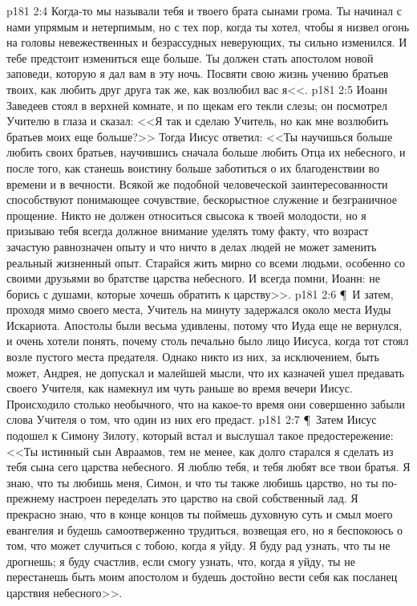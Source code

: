 \vs p181 2:4 Когда\hyp{}то мы называли тебя и твоего брата сынами грома. Ты начинал с нами упрямым и нетерпимым, но с тех пор, когда ты хотел, чтобы я низвел огонь на головы невежественных и безрассудных неверующих, ты сильно изменился. И тебе предстоит измениться еще больше. Ты должен стать апостолом новой заповеди, которую я дал вам в эту ночь. Посвяти свою жизнь учению братьев твоих, как любить друг друга так же, как возлюбил вас я<<.
\vs p181 2:5 Иоанн Заведеев стоял в верхней комнате, и по щекам его текли слезы; он посмотрел Учителю в глаза и сказал: <<Я так и сделаю Учитель, но как мне возлюбить братьев моих еще больше?>> Тогда Иисус ответил: <<Ты научишься больше любить своих братьев, научившись сначала больше любить Отца их небесного, и после того, как станешь воистину больше заботиться о их благоденствии во времени и в вечности. Всякой же подобной человеческой заинтересованности способствуют понимающее сочувствие, бескорыстное служение и безграничное прощение. Никто не должен относиться свысока к твоей молодости, но я призываю тебя всегда должное внимание уделять тому факту, что возраст зачастую равнозначен опыту и что ничто в делах людей не может заменить реальный жизненный опыт. Старайся жить мирно со всеми людьми, особенно со своими друзьями во братстве царства небесного. И всегда помни, Иоанн: не борись с душами, которые хочешь обратить к царству>>.
\vs p181 2:6 \P\ И затем, проходя мимо своего места, Учитель на минуту задержался около места Иуды Искариота. Апостолы были весьма удивлены, потому что Иуда еще не вернулся, и очень хотели понять, почему столь печально было лицо Иисуса, когда тот стоял возле пустого места предателя. Однако никто из них, за исключением, быть может, Андрея, не допускал и малейшей мысли, что их казначей ушел предавать своего Учителя, как намекнул им чуть раньше во время вечери Иисус. Происходило столько необычного, что на какое\hyp{}то время они совершенно забыли слова Учителя о том, что один из них его предаст.
\vs p181 2:7 \P\ Затем Иисус подошел к Симону Зилоту, который встал и выслушал такое предостережение: <<Ты истинный сын Авраамов, тем не менее, как долго старался я сделать из тебя сына сего царства небесного. Я люблю тебя, и тебя любят все твои братья. Я знаю, что ты любишь меня, Симон, и что ты также любишь царство, но ты по\hyp{}прежнему настроен переделать это царство на свой собственный лад. Я прекрасно знаю, что в конце концов ты поймешь духовную суть и смыл моего евангелия и будешь самоотверженно трудиться, возвещая его, но я беспокоюсь о том, что может случиться с тобою, когда я уйду. Я буду рад узнать, что ты не дрогнешь; я буду счастлив, если смогу узнать, что, когда я уйду, ты не перестанешь быть моим апостолом и будешь достойно вести себя как посланец царствия небесного>>.

